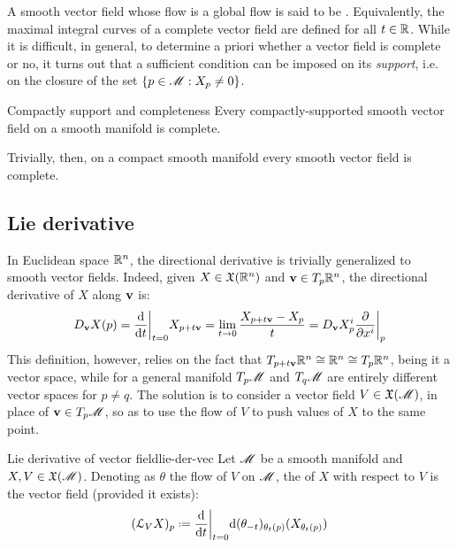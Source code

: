 A smooth vector field whose flow is a global flow is said to be . Equivalently, the maximal integral curves of a complete vector field are defined for all $ t \in \mathbb{R} $. While it is difficult, in general, to determine a priori whether a vector field is complete or no, it turns out that a sufficient condition can be imposed on its \emph{support}, i.e. on the closure of the set $ \{p \in \mathscr{M} : X_p \neq 0\} $.

\begin{proposition}{Compactly support and completeness}{}
  Every compactly-supported smooth vector field on a smooth manifold is complete.
\end{proposition}

Trivially, then, on a compact smooth manifold every smooth vector field is complete.

\subsection{Lie derivative}
\label{ssec:lie-der}

In Euclidean space $ \mathbb{R}^n $, the directional derivative is trivially generalized to smooth vector fields. Indeed, given $ X \in \mathfrak{X}(\mathbb{R}^n) $ and $ \mathbf{v} \in T_p\mathbb{R}^n $, the directional derivative of $ X $ along $ \mathbf{v} $ is:
\begin{equation}
  D_{\mathbf{v}} X(p) = \frac{\mathrm{d}}{\mathrm{d} t} \bigg\vert_{t = 0} X_{p + t \mathbf{v}} = \lim_{t \rightarrow 0} \frac{X_{p + t \mathbf{v}} - X_p}{t} = D_{\mathbf{v}} X^i_p \frac{\partial}{\partial x^i} \bigg\vert_p
  \label{eq:directional-derivative-vector-field}
\end{equation}
This definition, however, relies on the fact that $ T_{p + t\mathbf{v}}\mathbb{R}^n \cong \mathbb{R}^n \cong T_p\mathbb{R}^n $, being it a vector space, while for a general manifold $ T_p\mathscr{M} $ and $ T_q\mathscr{M} $ are entirely different vector spaces for $ p \neq q $. The solution is to consider a vector field $ V \in \mathfrak{X}(\mathscr{M}) $, in place of $ \mathbf{v} \in T_p\mathscr{M} $, so as to use the flow of $ V $ to push values of $ X $ to the same point.

\begin{definition}{Lie derivative of vector field}{lie-der-vec}
  Let $ \mathscr{M} $ be a smooth manifold and $ X,V \in \mathfrak{X}(\mathscr{M}) $. Denoting as $ \theta $ the flow of $ V $ on $ \mathscr{M} $, the  of $ X $ with respect to $ V $ is the vector field (provided it exists):
  \begin{equation}
    (\ld_V X)_p \defeq \frac{\dd}{\dd t} \bigg\vert_{t = 0} \dd (\theta_{-t})_{\theta_t(p)} (X_{\theta_t(p)})
  \end{equation}
\end{definition}

